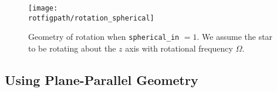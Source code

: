 \begin{figure}[tpb]
\hspace{-0.25in}
\centering
\texttt{[image: \\rotfigpath/rotation\_spherical]}
\begin{minipage}[h]{2.0in}
\vspace{-4in}
\caption[Rotation geometry]
{Geometry of rotation when {\tt spherical\_in} $=1$.  We assume the 
star to be rotating about the $z$ axis with rotational frequency $\Omega$.}
\end{minipage}
\label{Fig:rotation in spherical}
\end{figure}

\subsection{Using Plane-Parallel Geometry}\label{Sec:Using Plane-Parallel Geometry}
